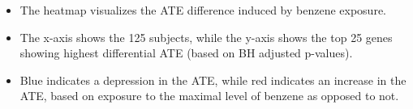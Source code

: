 \documentclass[landscape,a0paper,fontscale=0.285]{baposter} %
\newcommand{\1}{\mathbbm{1}}
\begin{document}
\begin{poster}
{\begin{multicols}{2}
\vspace{-15pt}

\begin{itemize}
  \itemsep0pt
  \item The heatmap visualizes the ATE difference induced by benzene exposure.
  \item The x-axis shows the 125 subjects, while the y-axis shows the top 25
    genes showing highest differential ATE (based on BH adjusted p-values).
  \item Blue indicates a depression in the ATE, while red indicates an increase
    in the ATE, based on exposure to the maximal level of benzene as opposed to
    not.\\
\end{itemize}

\end{multicols}
}



\end{poster}
\end{document}
